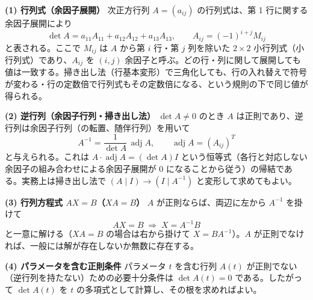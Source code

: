 \documentclass[a4paper,11pt]{article}
\begin{document}


\noindent
\textbf{(1) 行列式（余因子展開）} 次正方行列 $A = (a_{ij})$ の行列式は、第 1 行に関する余因子展開により
\[
\det A = a_{11}A_{11} + a_{12}A_{12} + a_{13}A_{13}, \qquad
A_{ij} = (-1)^{i+j}M_{ij}
\]
と表される。ここで $M_{ij}$ は $A$ から第 $i$ 行・第 $j$ 列を除いた $2\times 2$ 小行列式（小行列式）であり、$A_{ij}$ を $(i,j)$ 余因子と呼ぶ。どの行・列に関して展開しても値は一致する。掃き出し法（行基本変形）で三角化しても、行の入れ替えで符号が変わる・行の定数倍で行列式もその定数倍になる、という規則の下で同じ値が得られる。

\noindent
\textbf{(2) 逆行列（余因子行列・掃き出し法）}\quad
$\det A \neq 0$ のとき $A$ は正則であり、逆行列は余因子行列（の転置、随伴行列）を用いて
\[
A^{-1} = \frac{1}{\det A}\,\operatorname{adj}A, \qquad
\operatorname{adj}A = (A_{ij})^{T}
\]
と与えられる。これは $A \cdot \operatorname{adj}A = (\det A) I$ という恒等式（各行と対応しない余因子の組み合わせによる余因子展開が $0$ になることから従う）の帰結である。実務上は掃き出し法で $(A \mid I) \to (I \mid A^{-1})$ と変形して求めてもよい。

\noindent
\textbf{(3) 行列方程式 $AX = B$（$XA = B$）}\quad
$A$ が正則ならば、両辺に左から $A^{-1}$ を掛けて
\[
AX = B \;\Longrightarrow\; X = A^{-1}B
\]
と一意に解ける（$XA = B$ の場合は右から掛けて $X = BA^{-1}$）。$A$ が正則でなければ、一般には解が存在しないか無数に存在する。

\noindent
\textbf{(4) パラメータを含む正則条件}\quad
パラメータ $t$ を含む行列 $A(t)$ が正則でない（逆行列を持たない）ための必要十分条件は $\det A(t) = 0$ である。したがって $\det A(t)$ を $t$ の多項式として計算し、その根を求めればよい。
\end{document}
